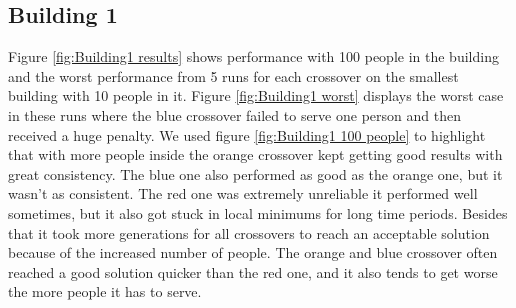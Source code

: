 \newpage

\subsection{Building 1}
Figure \ref{fig:Building1 results} shows performance with 100 people in the building and the worst performance from 5 runs for each crossover on the smallest building with 10 people in it. Figure \ref{fig:Building1 worst} displays the worst case in these runs where the blue crossover failed to serve one person and then received a huge penalty. We used figure \ref{fig:Building1 100 people} to highlight that with more people inside the orange crossover kept getting good results with great consistency. The blue one also performed as good as the orange one, but it wasn't as consistent. The red one was extremely unreliable it performed well sometimes, but it also got stuck in local minimums for long time periods. Besides that it took more generations for all crossovers to reach an acceptable solution because of the increased number of people. The orange and blue crossover often reached a good solution quicker than the red one, and it also tends to get worse the more people it has to serve.

